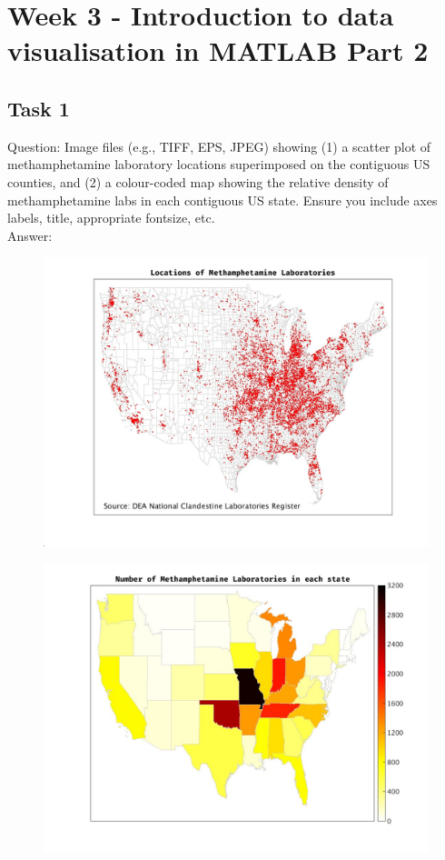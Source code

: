 \documentclass[12pt,a4paper]{report}
\begin{document}
\section{Week 3 - Introduction to data visualisation in MATLAB Part 2}

\subsection{Task 1}
Question: Image files (e.g., TIFF, EPS, JPEG) showing (1) a scatter plot of methamphetamine laboratory locations
superimposed on the contiguous US counties, and (2) a colour-coded map showing the relative density of
methamphetamine labs in each contiguous US state. Ensure you include axes labels, title, appropriate
fontsize, etc.
\\
Answer:

\begin{figure}[H]
\centering
\includegraphics[width=\textwidth]{../Code/week 3/ScatterPlotMethLabs.jpg} 
\end{figure}

\begin{figure}[H]
\centering
\includegraphics[width=\textwidth]{../Code/week 3/relitiveDensities.jpg}
\end{figure}
 
\end{document}
